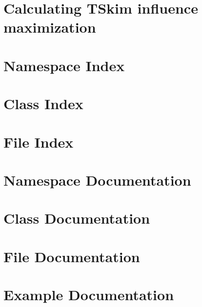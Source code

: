 \documentclass[twoside]{book}
\newcommand{\+}{\discretionary{\mbox{\scriptsize$\hookleftarrow$}}{}{}}
\newcommand{\clearemptydoublepage}{%
  \newpage{\pagestyle{empty}\cleardoublepage}%
}
\begin{document}
\chapter{Calculating T\+Skim influence maximization}
\label{TSkimTut}
\hypertarget{TSkimTut}{}

\chapter{Namespace Index}

\chapter{Class Index}

\chapter{File Index}

\chapter{Namespace Documentation}



\chapter{Class Documentation}







\chapter{File Documentation}





\chapter{Example Documentation}





\backmatter
\newpage
{}
\clearemptydoublepage
{}
\printindex
\end{document}
